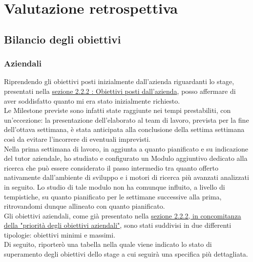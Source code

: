 

\chapter{Valutazione retrospettiva}
\label{valutazione_retrospettiva}

\section{Bilancio degli obiettivi}

	\subsection{Aziendali}
	
	Riprendendo gli obiettivi posti inizialmente dall'azienda riguardanti lo stage, presentati nella \hyperref[sub:obiettivi_posti_azienda]{sezione 2.2.2 : Obiettivi posti dall'azienda}, posso affermare di aver soddisfatto quanto mi era stato inizialmente richiesto. \\
	Le \gls{Milestone} previste sono infatti state raggiunte nei tempi prestabiliti, con un'eccezione: la presentazione dell'elaborato al team di lavoro, prevista per la fine dell'ottava settimana, è stata anticipata alla conclusione della settima settimana così da evitare l'incorrere di eventuali imprevisti. \\
	Nella prima settimana di lavoro, in aggiunta a quanto pianificato e su indicazione del tutor aziendale, ho studiato e configurato un \gls{Modulo} aggiuntivo dedicato alla ricerca che può essere considerato il passo intermedio tra quanto offerto nativamente dall'ambiente di sviluppo e i motori di ricerca più avanzati analizzati in seguito. Lo studio di tale modulo non ha comunque influito, a livello di tempistiche, su quanto pianificato per le settimane successive alla prima, ritrovandomi dunque allineato con quanto pianificato. \\
	Gli obiettivi aziendali, come già presentato nella \hyperref[subsub:priorita_degli_obiettivi_aziendali]{sezione 2.2.2, in concomitanza della "priorità degli obiettivi aziendali"}, sono stati suddivisi in due differenti tipologie: obiettivi minimi e massimi. \\
	Di seguito, riporterò una tabella nella quale viene indicato lo stato di superamento degli obiettivi dello stage a cui seguirà una specifica più dettagliata.

